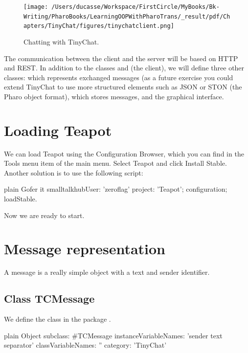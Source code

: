 \documentclass[10pt,twoside,english]{_support/latex/sbabook/sbabook}
\begin{document}
\begin{figure}

\begin{center}
\texttt{[image: /Users/ducasse/Workspace/FirstCircle/MyBooks/Bk-Writing/PharoBooks/LearningOOPWithPharoTrans/\_result/pdf/Chapters/TinyChat/figures/tinychatclient.png]}\caption{Chatting with TinyChat.\label{tinychatclient}}\end{center}
\end{figure}


The communication between the client and the server will be based on HTTP and REST.
In addition to the classes  and  (the client), we will define three other classes: 
 which represents exchanged messages (as a future exercise you could extend TinyChat to use 
more structured elements such as JSON or STON (the Pharo object format),  which stores
messages, and  the graphical interface.
\section{Loading Teapot}
We can load Teapot using the Configuration Browser, which you can find in the Tools menu item of the main menu.
Select Teapot and click Install Stable. Another solution is to use the following script:

\begin{displaycode}{plain}
Gofer it
    smalltalkhubUser: 'zeroflag' project: 'Teapot';
    configuration;
    loadStable.
\end{displaycode}

Now we are ready to start.
\section{Message representation}
A message is a really simple object with a text and sender identifier. 
\subsection{Class TCMessage}
We define the class  in the package .

\begin{displaycode}{plain}
Object subclass: #TCMessage
	instanceVariableNames: 'sender text separator'
	classVariableNames: ''
	category: 'TinyChat'
\end{displaycode}
\end{document}
